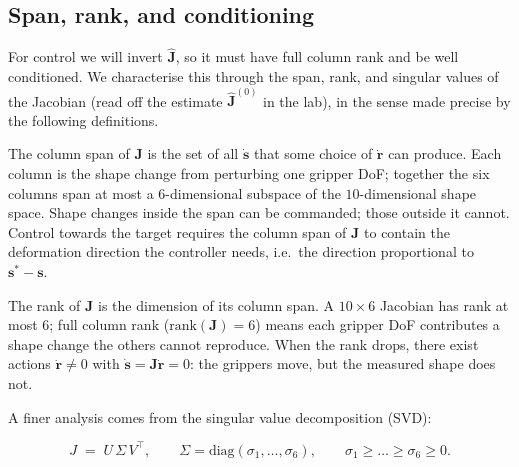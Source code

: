 \documentclass[11pt,a4paper]{article}
\begin{document}
\subsection{Span, rank, and conditioning}

For control we will invert $\hat{\mathbf{J}}$, so it must have full column rank and be well
conditioned. We characterise this through the span, rank, and singular values of the
Jacobian (read off the estimate $\hat{\mathbf{J}}^{(0)}$ in the lab), in the sense made precise by
the following definitions.

\begin{intuition}
The column span of $\mathbf{J}$ is the set of all $\dot{\mathbf{s}}$ that some choice of $\dot{\mathbf{r}}$ can
produce. Each column is the shape change from perturbing one gripper DoF; together the
six columns span at most a $6$-dimensional subspace of the $10$-dimensional shape
space. Shape changes inside the span can be commanded; those outside it cannot. Control
towards the target requires the column span of $\mathbf{J}$ to contain the deformation direction
the controller needs, i.e.\ the direction proportional to $\mathbf{s}^{*}-\mathbf{s}$.
\end{intuition}

\begin{intuition}
The rank of $\mathbf{J}$ is the dimension of its column span. A $10\times 6$ Jacobian has rank at
most $6$; full column rank ($\mathrm{rank}(\mathbf{J})=6$) means each gripper DoF contributes a
shape change the others cannot reproduce. When the rank drops, there exist actions
$\dot{\mathbf{r}}\neq 0$ with $\dot{\mathbf{s}} = \mathbf{J}\dot{\mathbf{r}} = 0$: the grippers move, but the measured shape does
not.
\end{intuition}

A finer analysis comes from the singular value decomposition (SVD):
\begin{tcolorbox}[mathbox]
\begin{equation}
    J \;=\; U\,\Sigma\,V^{\top},\qquad
    \Sigma = \mathrm{diag}(\sigma_1,\dots,\sigma_6),\qquad
    \sigma_1 \geq \dots \geq \sigma_6 \geq 0.
\end{equation}
\end{tcolorbox}
\end{document}
